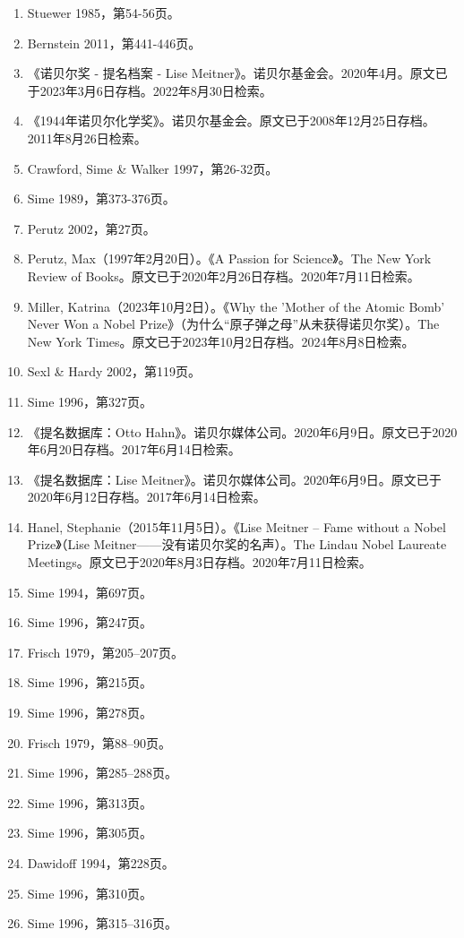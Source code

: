 \begin{enumerate}
\item Stuewer 1985，第54-56页。
\item Bernstein 2011，第441-446页。
\item 《诺贝尔奖 - 提名档案 - Lise Meitner》。诺贝尔基金会。2020年4月。原文已于2023年3月6日存档。2022年8月30日检索。
\item 《1944年诺贝尔化学奖》。诺贝尔基金会。原文已于2008年12月25日存档。2011年8月26日检索。
\item Crawford, Sime & Walker 1997，第26-32页。
\item Sime 1989，第373-376页。
\item Perutz 2002，第27页。
\item Perutz, Max（1997年2月20日）。《A Passion for Science》。The New York Review of Books。原文已于2020年2月26日存档。2020年7月11日检索。
\item Miller, Katrina（2023年10月2日）。《Why the 'Mother of the Atomic Bomb' Never Won a Nobel Prize》（为什么“原子弹之母”从未获得诺贝尔奖）。The New York Times。原文已于2023年10月2日存档。2024年8月8日检索。
\item Sexl & Hardy 2002，第119页。
\item Sime 1996，第327页。
\item 《提名数据库：Otto Hahn》。诺贝尔媒体公司。2020年6月9日。原文已于2020年6月20日存档。2017年6月14日检索。
\item 《提名数据库：Lise Meitner》。诺贝尔媒体公司。2020年6月9日。原文已于2020年6月12日存档。2017年6月14日检索。
\item Hanel, Stephanie（2015年11月5日）。《Lise Meitner – Fame without a Nobel Prize》（Lise Meitner——没有诺贝尔奖的名声）。The Lindau Nobel Laureate Meetings。原文已于2020年8月3日存档。2020年7月11日检索。
\item Sime 1994，第697页。
\item Sime 1996，第247页。
\item Frisch 1979，第205–207页。
\item Sime 1996，第215页。
\item Sime 1996，第278页。
\item Frisch 1979，第88–90页。
\item Sime 1996，第285–288页。
\item Sime 1996，第313页。
\item Sime 1996，第305页。
\item Dawidoff 1994，第228页。
\item Sime 1996，第310页。
\item Sime 1996，第315–316页。

\end{enumerate}
